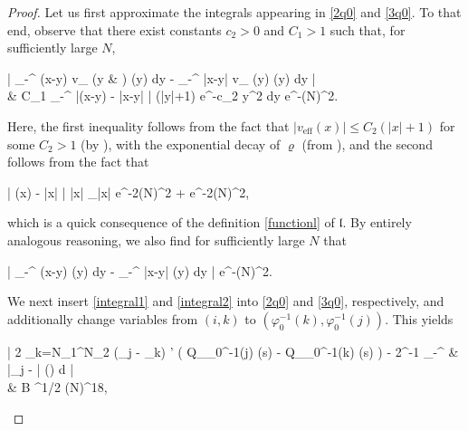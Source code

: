 \documentclass{amsart}
\numberwithin{equation}{section}
\DeclareMathOperator{\eff}{eff}
\theoremstyle{remark}
\theoremstyle{definition}
\begin{document}
\begin{proof}
		Let us first approximate the integrals appearing in \eqref{2q0} and \eqref{3q0}. To that end, observe that there exist constants $c_2>0$ and $C_1>1$ such that, for sufficiently large $N$,
		\begin{flalign}
			\label{integral1} 
			\begin{aligned} 
			\Bigg| \displaystyle\int_{-\infty}^{\infty} (x-y) v_{\eff} (y & ) \varrho(y) dy - \displaystyle\int_{-\infty}^{\infty} \log |x-y| v_{\eff} (y) \varrho (y) dy \Bigg| \\
			& \le C_1 \displaystyle\int_{-\infty}^{\infty} \big|(x-y) - \log |x-y| \big| \cdot  (|y|+1) e^{-c_2 y^2} dy \le e^{-(\log N)^2}.
			\end{aligned} 
		\end{flalign}
		
		\noindent Here, the first inequality follows from the fact that $|v_{\eff} (x)| \le C_2 (|x|+1)$ for some $C_2 > 1$ (by ), with the exponential decay of $\varrho$ (from ), and the second follows from the fact that 
		\begin{flalign*} 
			\big| (x) - \log |x| \big|  |\log x|  \cdot {}_{|x| \le e^{-2(\log N)^2}} + e^{-2(\log N)^2},
		\end{flalign*} 
		
		\noindent which is a quick consequence of the definition \eqref{functionl} of $\mathfrak{l}$. By entirely analogous reasoning, we also find for sufficiently large $N$ that  
		\begin{flalign}
			\label{integral2} 
			\Bigg| \displaystyle\int_{-\infty}^{\infty}  (x-y) \varrho (y) dy - \displaystyle\int_{-\infty}^{\infty} \log |x-y| \varrho(y) dy \Bigg| \le e^{-(\log N)^2}.
		\end{flalign} 
		
		We next	insert \eqref{integral1} and \eqref{integral2} into \eqref{2q0} and \eqref{3q0}, respectively, and additionally change variables from $(i, k)$ to $(\varphi_0^{-1} (k), \varphi_0^{-1} (j))$. This yields  
			\begin{flalign}
			\label{4q0} 
			\begin{aligned} 
			\Bigg| 2 \displaystyle\sum_{k=N_1}^{N_2}  (\Lambda_j - \Lambda_k) \cdot \chi' \big( Q_{\varphi_0^{-1}(j)} (s) - Q_{\varphi_0^{-1}(k)} (s) \big) - 2\alpha^{-1}  \displaystyle\int_{-\infty}^{\infty} &  \log |\Lambda_j - \lambda| \varrho (\lambda) d \lambda \Bigg| \\
			&  B ^{1/2} (\log N)^{18},
			\end{aligned} 
		\end{flalign} 
		

\end{proof}
\end{document}
